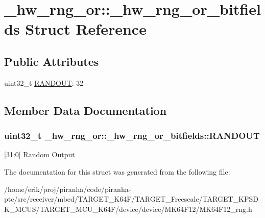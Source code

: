 \hypertarget{struct__hw__rng__or_1_1__hw__rng__or__bitfields}{}\section{\+\_\+hw\+\_\+rng\+\_\+or\+:\+:\+\_\+hw\+\_\+rng\+\_\+or\+\_\+bitfields Struct Reference}
\label{struct__hw__rng__or_1_1__hw__rng__or__bitfields}
\subsection*{Public Attributes}
\begin{DoxyCompactItemize}
\item 
uint32\+\_\+t \hyperlink{struct__hw__rng__or_1_1__hw__rng__or__bitfields_a3a7872e29ecd470868306a74a0cee8f4}{R\+A\+N\+D\+O\+UT}\+: 32
\end{DoxyCompactItemize}


\subsection{Member Data Documentation}
\subsubsection[{\texorpdfstring{R\+A\+N\+D\+O\+UT}{RANDOUT}}]{\setlength{\rightskip}{0pt plus 5cm}uint32\+\_\+t \+\_\+hw\+\_\+rng\+\_\+or\+::\+\_\+hw\+\_\+rng\+\_\+or\+\_\+bitfields\+::\+R\+A\+N\+D\+O\+UT}\hypertarget{struct__hw__rng__or_1_1__hw__rng__or__bitfields_a3a7872e29ecd470868306a74a0cee8f4}{}\label{struct__hw__rng__or_1_1__hw__rng__or__bitfields_a3a7872e29ecd470868306a74a0cee8f4}
\mbox{[}31\+:0\mbox{]} Random Output 

The documentation for this struct was generated from the following file\+:\begin{DoxyCompactItemize}
\item 
/home/erik/proj/piranha/code/piranha-\/ptc/src/receiver/mbed/\+T\+A\+R\+G\+E\+T\+\_\+\+K64\+F/\+T\+A\+R\+G\+E\+T\+\_\+\+Freescale/\+T\+A\+R\+G\+E\+T\+\_\+\+K\+P\+S\+D\+K\+\_\+\+M\+C\+U\+S/\+T\+A\+R\+G\+E\+T\+\_\+\+M\+C\+U\+\_\+\+K64\+F/device/device/\+M\+K64\+F12/M\+K64\+F12\+\_\+rng.\+h\end{DoxyCompactItemize}
